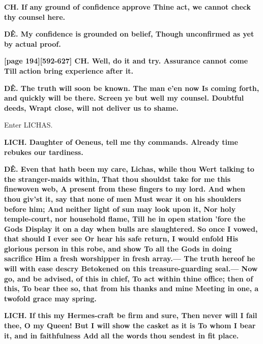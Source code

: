 \documentclass[11pt,letter]{book}
\begin{document}
\par \textbf{CH. If any ground of confidence approve Thine act, we cannot check thy counsel here.}
\par 

\par \textbf{DÊ. My confidence is grounded on belief, Though unconfirmed as yet by actual proof.}
\par 

\par \textbf{[page 194][592-627] CH. Well, do it and try. Assurance cannot come Till action bring experience after it.}
\par 

\par \textbf{DÊ. The truth will soon be known. The man e’en now Is coming forth, and quickly will be there. Screen ye but well my counsel. Doubtful deeds, Wrapt close, will not deliver us to shame.}
\par 

\par  Enter LICHAS.

\par \textbf{LICH. Daughter of Oeneus, tell me thy commands. Already time rebukes our tardiness.}
\par 

\par \textbf{DÊ. Even that hath been my care, Lichas, while thou Wert talking to the stranger-maids within, That thou shouldst take for me this finewoven web, A present from these fingers to my lord. And when thou giv’st it, say that none of men Must wear it on his shoulders before him; And neither light of sun may look upon it, Nor holy temple-court, nor household flame, Till he in open station ’fore the Gods Display it on a day when bulls are slaughtered. So once I vowed, that should I ever see Or hear his safe return, I would enfold His glorious person in this robe, and show To all the Gods in doing sacrifice Him a fresh worshipper in fresh array.— The truth hereof he will with ease descry Betokened on this treasure-guarding seal.— Now go, and be advised, of this in chief, To act within thine office; then of this, To bear thee so, that from his thanks and mine Meeting in one, a twofold grace may spring.}
\par 

\par \textbf{LICH. If this my Hermes-craft be firm and sure, Then never will I fail thee, O my Queen! But I will show the casket as it is To whom I bear it, and in faithfulness Add all the words thou sendest in fit place.}
\par 
\end{document}
